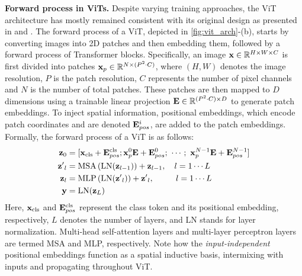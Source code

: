 \documentclass[runningheads]{llncs}
\renewcommand{\paragraph}[1]{\vspace{1.25mm}\noindent\textbf{#1}}
\begin{document}
\paragraph{Forward process in ViTs.} Despite varying training approaches, the ViT architecture has mostly remained consistent with its original design as presented in \cite{dosovitskiy2021image} and \cite{vaswani2023attention}. The forward process of a ViT, depicted in \cref{fig:vit_arch}-(b), starts by converting images into 2D patches and then embedding them, followed by a forward process of Transformer blocks. Specifically, an image $\vb{x} \in \mathbb{R}^{H\times W \times C}$ is first divided into patches $\vb{x}_{p} \in \mathbb{R}^{N\times (P^2 \cdot C)}$, where $(H, W)$ denotes the image resolution, $P$ is the patch resolution, $C$ represents the number of pixel channels and $N$ is the number of total patches. These patches are then mapped to $D$ dimensions using a trainable linear projection $\vb{E} \in {\mathbb{R}^{(P^2 \cdot C)\times D}}$ to generate patch embeddings. To inject spatial information, positional embeddings, which encode patch coordinates and are denoted $\vb{E}_{pos}^{i}$, are added to the patch embeddings. Formally, the forward process of a ViT is as follows:
\begin{align}
    \vb{z}_0  & = [ \vb{x}_{\text{cls}} + \vb{E}_{pos}^{\text{cls}} ; \vb{x}_p^0\vb{E} + \vb{E}_{pos}^{0} ; ~\cdots ; ~\vb{x}_p^{N-1}\vb{E} + \vb{E}_{pos}^{N-1}]  \label{eq1} \\
    \vb{z'}_l & =\text{MSA}\left( \text{LN} (\vb{z}_{l-1}) \right) + \vb{z}_{l-1}, \quad l= 1 \cdots L \label{eq2}                                                             \\
    \vb{z}_l  & =\text{MLP}\left( \text{LN} (\vb{z'}_{l}) \right) + \vb{z'}_{l}, \quad\quad ~~l= 1 \cdots L \label{eq3}                                                        \\
    \vb{y}    & = \text{LN} (\vb{z}_{L}) \label{eq4}
\end{align}
Here, $\vb{x}_{\text{cls}}$ and $\vb{E}_{pos}^{\text{cls}}$ represent the class token and its positional embedding, respectively, $L$ denotes the number of layers, and LN stands for layer normalization. Multi-head self-attention layers and multi-layer perceptron layers are termed MSA and MLP, respectively. Note how the \textit{input-independent} positional embeddings function as a spatial inductive basis, intermixing with inputs and propagating throughout ViT.
\end{document}
